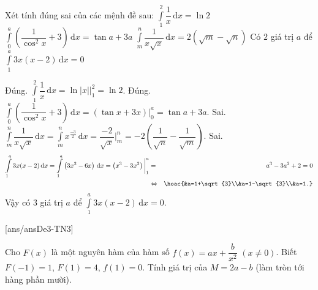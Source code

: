 \begin{ex}%
	Xét tính đúng sai của các mệnh đề sau:
	\choiceTF
	{\True $\displaystyle\int\limits_1^2 \dfrac{1}{x}\mathrm{\,d}x=\ln 2$}
	{\True $\displaystyle\int\limits_0^a \left(\dfrac{1}{\cos^2 x}+3\right)\mathrm{\,d}x=\tan a+3a$}
	{$\displaystyle\int\limits_m^n \dfrac{1}{x\sqrt{x}}\mathrm{\,d}x=2\left(\sqrt{m}-\sqrt{n}\right)$}
	{Có $2$ giá trị $a$ để $\displaystyle\int\limits_1^a 3x(x-2)\mathrm{\,d}x=0$}
	\loigiai
	{
		\begin{itemchoice}
			\itemch Đúng. $\displaystyle\int\limits_1^2 \dfrac{1}{x}\mathrm{\,d}x=\ln |x|\bigg\rvert_1^2=\ln 2$.
			\itemch Đúng. $\displaystyle\int\limits_0^a \left(\dfrac{1}{\cos^2 x}+3\right)\mathrm{\,d}x=(\tan x+3x)\bigg\rvert_0^a=\tan a+3a$.
			\itemch Sai. $\displaystyle\int\limits_m^n \dfrac{1}{x\sqrt{x}}\mathrm{\,d}x=\displaystyle\int\limits_m^n x^{\tfrac{-3}{2}}\mathrm{\,d}x=\dfrac{-2}{\sqrt{x}}\bigg\rvert_m^n=-2\left(\dfrac{1}{\sqrt{n}}-\dfrac{1}{\sqrt{m}}\right)$.
			\itemch Sai.
			\begin{eqnarray*}
				\displaystyle\int\limits_1^a 3x(x-2)\mathrm{\,d}x=\displaystyle\int\limits_1^a \left(3x^2-6x\right)\mathrm{\,d}x=\left(x^3-3x^2\right)\bigg\rvert_1^a&=&a^3-3a^2+2=0\\
				&\Leftrightarrow&\hoac{&a=1+\sqrt{3}\\&a=1-\sqrt{3}\\&a=1.}
			\end{eqnarray*}
			Vậy có $3$ giá trị $a$ để $\displaystyle\int\limits_1^a 3x(x-2)\mathrm{\,d}x=0$.
		\end{itemchoice}
	}
\end{ex}

\TNSA
{}[ans/ansDe3-TN3]
\begin{ex}%
	Cho $F(x)$ là một nguyên hàm của hàm số $f(x) = ax + \dfrac{b}{x^2}$ $(x \neq 0)$. Biết $F(-1) = 1$, $F(1) = 4$, $f(1) = 0$. Tính giá trị của $M = 2a - b$ (làm tròn tới hàng phần mười).
\end{ex}


